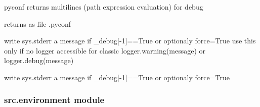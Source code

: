 \documentclass[a4paper,10pt,english]{sphinxmanual}
\begin{document}

\begin{fulllineitems}
\label{\detokenize{commands/apidoc/src:src.debug.saveConfigDbg}}
pyconf returns multilines (path expression evaluation) for debug

\end{fulllineitems}


\begin{fulllineitems}
\label{\detokenize{commands/apidoc/src:src.debug.saveConfigStd}}
returns as file .pyconf

\end{fulllineitems}


\begin{fulllineitems}
\label{\detokenize{commands/apidoc/src:src.debug.tofix}}
write sys.stderr a message if \_debug{[}-1{]}==True or optionaly force=True
use this only if no logger accessible for classic 
logger.warning(message) or logger.debug(message)

\end{fulllineitems}


\begin{fulllineitems}
\label{\detokenize{commands/apidoc/src:src.debug.write}}
write sys.stderr a message if \_debug{[}-1{]}==True or optionaly force=True

\end{fulllineitems}



\subsubsection{src.environment module}
\label{\detokenize{commands/apidoc/src:src-environment-module}}\label{\detokenize{commands/apidoc/src:module-src.environment}}
\end{document}
